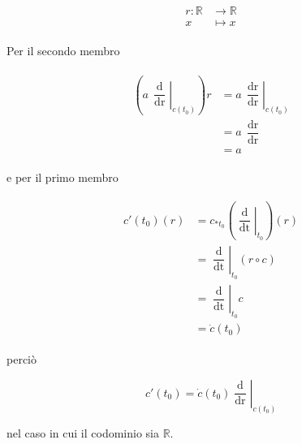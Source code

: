 \begin{align}
	\begin{split}
		r : \mathbb{R} &\to \mathbb{R}\\
		x &\mapsto x
	\end{split}
\end{align}

Per il secondo membro

\begin{align}
	\begin{split}
		\left( a \, \left. \dfrac{\operatorname{d}}{\operatorname{dr}} \right|_{c(t_{0})} \right) r &= a \, \left. \dfrac{\operatorname{dr}}{\operatorname{dr}} \right|_{c(t_{0})}\\
		&= a \, \dfrac{\operatorname{dr}}{\operatorname{dr}}\\
		&= a
	\end{split}
\end{align}

e per il primo membro

\begin{align}
	\begin{split}
		c'(t_{0})(r) &= c_{*t_{0}} \left( \left. \dfrac{\operatorname{d}}{\operatorname{dt}} \right|_{t_{0}} \right)(r)\\
		&= \left. \dfrac{\operatorname{d}}{\operatorname{dt}} \right|_{t_{0}} (r \circ c)\\
		&= \left. \dfrac{\operatorname{d}}{\operatorname{dt}} \right|_{t_{0}} c\\
		&= \dot{c}(t_{0})
	\end{split}
\end{align}

perciò

\begin{equation}
	c'(t_{0}) = \dot{c}(t_{0}) \left. \dfrac{\operatorname{d}}{\operatorname{dr}} \right|_{c(t_{0})}
\end{equation}

nel caso in cui il codominio sia $ \mathbb{R} $.


